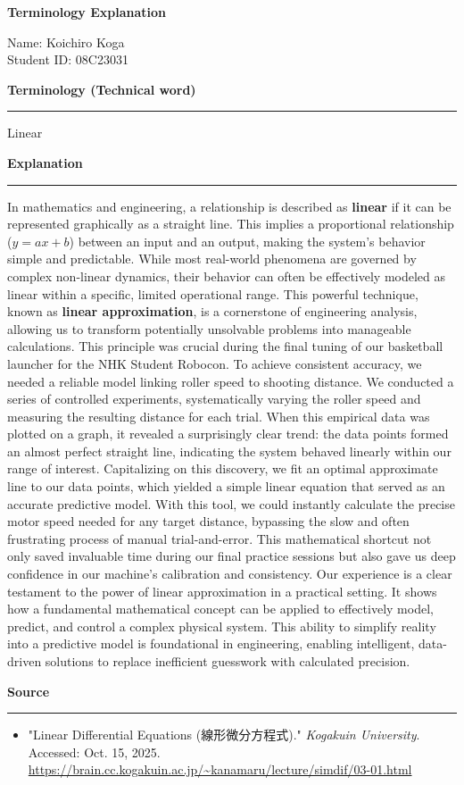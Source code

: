 \documentclass[11pt, dvipdfmx]{jsarticle}
\begin{document}
\pagestyle{empty}

\fontsize{10.5pt}{12.5pt}\selectfont
\linespread{1.09}

\begin{center}
    \Large{\textbf{Terminology Explanation}}
\end{center}

\noindent Name: Koichiro Koga \\
Student ID: 08C23031


\noindent\large{\textbf{Terminology (Technical word)}}
\hrule
\vspace{0.2cm}
\noindent Linear


\noindent\large{\textbf{Explanation}}
\hrule
\vspace{0.2cm}
In mathematics and engineering, a relationship is described as \textbf{linear} if it can be represented graphically as a straight line. 
This implies a proportional relationship ($y = ax + b$) between an input and an output, making the system's behavior simple and predictable. 
While most real-world phenomena are governed by complex non-linear dynamics, 
their behavior can often be effectively modeled as linear within a specific, limited operational range. 
This powerful technique, known as \textbf{linear approximation}, is a cornerstone of engineering analysis, 
allowing us to transform potentially unsolvable problems into manageable calculations.
This principle was crucial during the final tuning of our basketball launcher for the NHK Student Robocon. 
To achieve consistent accuracy, we needed a reliable model linking roller speed to shooting distance. 
We conducted a series of controlled experiments, systematically varying the roller speed and measuring the resulting distance for each trial. 
When this empirical data was plotted on a graph, it revealed a surprisingly clear trend: the data points formed an almost perfect straight line, 
indicating the system behaved linearly within our range of interest.
Capitalizing on this discovery, we fit an optimal approximate line to our data points, 
which yielded a simple linear equation that served as an accurate predictive model. With this tool, 
we could instantly calculate the precise motor speed needed for any target distance, 
bypassing the slow and often frustrating process of manual trial-and-error. 
This mathematical shortcut not only saved invaluable time during our final practice sessions 
but also gave us deep confidence in our machine's calibration and consistency.
Our experience is a clear testament to the power of linear approximation in a practical setting. 
It shows how a fundamental mathematical concept can be applied to effectively model, 
predict, and control a complex physical system. This ability to simplify reality into a predictive model is foundational in engineering, 
enabling intelligent, data-driven solutions to replace inefficient guesswork with calculated precision.

\vspace{1cm}

\noindent\large{\textbf{Source}}
\hrule
\vspace{0.3cm}
\begin{itemize}
    \item "Linear Differential Equations (線形微分方程式)." \textit{Kogakuin University}. Accessed: Oct. 15, 2025. \url{https://brain.cc.kogakuin.ac.jp/~kanamaru/lecture/simdif/03-01.html}
\end{itemize}
\end{document}
